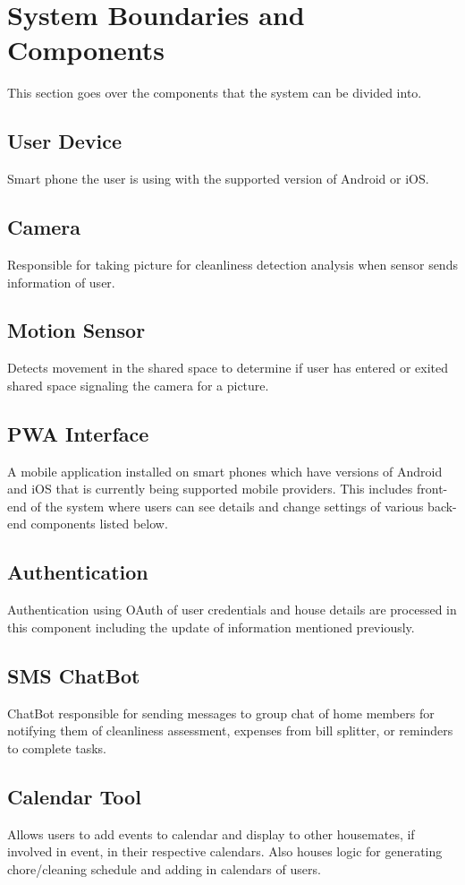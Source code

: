 \documentclass{article}
\begin{document}
\section{System Boundaries and Components}
This section goes over the components that the system can be divided into.

\subsection{User Device}
Smart phone the user is using with the supported version of Android or iOS.

\subsection{Camera}
Responsible for taking picture for cleanliness detection analysis when sensor sends information of user.

\subsection{Motion Sensor}
Detects movement in the shared space to determine if user has entered or exited shared space signaling the camera for a picture.

\subsection{PWA Interface}
A mobile application installed on smart phones which have versions of Android and iOS that is currently being supported mobile providers. This includes front-end of the system where users can see details and change settings of various back-end components listed below.

\subsection{Authentication}
Authentication using OAuth of user credentials and house details are processed in this component including the update of information mentioned previously.

\subsection{SMS ChatBot}
ChatBot responsible for sending messages to group chat of home members for notifying them of cleanliness assessment, expenses from bill splitter, or reminders to complete tasks.

\subsection{Calendar Tool}
Allows users to add events to calendar and display to other housemates, if involved in event, in their respective calendars. Also houses logic for generating chore/cleaning schedule and adding in calendars of users.
\end{document}
